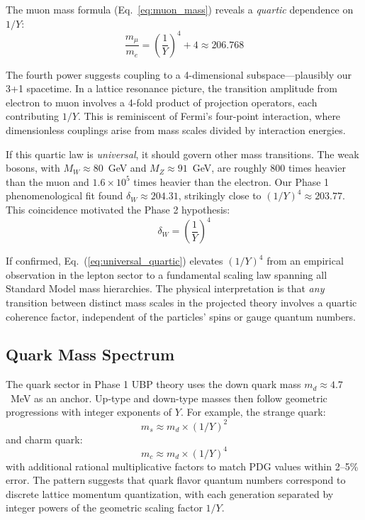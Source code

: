 \documentclass[11pt,a4paper]{article}
\begin{document}
The muon mass formula (Eq.~\ref{eq:muon_mass}) reveals a \emph{quartic} dependence on $1/Y$:
\begin{equation}
\frac{m_\mu}{m_e} = \left(\frac{1}{Y}\right)^4 + 4 \approx 206.768
\end{equation}

The fourth power suggests coupling to a 4-dimensional subspace---plausibly our 3+1 spacetime. In a lattice resonance picture, the transition amplitude from electron to muon involves a 4-fold product of projection operators, each contributing $1/Y$. This is reminiscent of Fermi's four-point interaction, where dimensionless couplings arise from mass scales divided by interaction energies.

If this quartic law is \emph{universal}, it should govern other mass transitions. The weak bosons, with $M_W \approx 80$~GeV and $M_Z \approx 91$~GeV, are roughly 800 times heavier than the muon and $1.6 \times 10^5$ times heavier than the electron. Our Phase 1 phenomenological fit found $\delta_W \approx 204.31$, strikingly close to $(1/Y)^4 \approx 203.77$. This coincidence motivated the Phase 2 hypothesis:
\begin{equation}
\delta_W = \left(\frac{1}{Y}\right)^4
\label{eq:universal_quartic}
\end{equation}

If confirmed, Eq.~(\ref{eq:universal_quartic}) elevates $(1/Y)^4$ from an empirical observation in the lepton sector to a fundamental scaling law spanning all Standard Model mass hierarchies. The physical interpretation is that \emph{any} transition between distinct mass scales in the projected theory involves a quartic coherence factor, independent of the particles' spins or gauge quantum numbers.

\subsection{Quark Mass Spectrum}

The quark sector in Phase 1 UBP theory uses the down quark mass $m_d \approx 4.7$~MeV as an anchor. Up-type and down-type masses then follow geometric progressions with integer exponents of $Y$. For example, the strange quark:
\begin{equation}
m_s \approx m_d \times (1/Y)^2
\end{equation}
and charm quark:
\begin{equation}
m_c \approx m_d \times (1/Y)^4
\end{equation}
with additional rational multiplicative factors to match PDG values within 2--5\% error. The pattern suggests that quark flavor quantum numbers correspond to discrete lattice momentum quantization, with each generation separated by integer powers of the geometric scaling factor $1/Y$.
\end{document}
